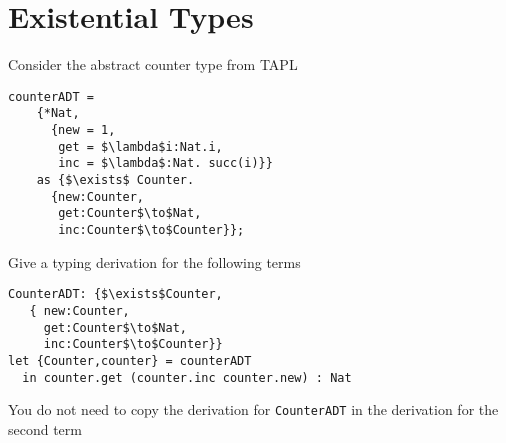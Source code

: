\section{Existential Types}
Consider the abstract counter type from TAPL
\begin{lstlisting}[mathescape=true]
  counterADT = 
    {*Nat,
      {new = 1,
       get = $\lambda$i:Nat.i,
       inc = $\lambda$:Nat. succ(i)}}
    as {$\exists$ Counter.
      {new:Counter,
       get:Counter$\to$Nat,
       inc:Counter$\to$Counter}}; 
\end{lstlisting}
Give a typing derivation for the following terms 
\begin{lstlisting}[mathescape=true]
CounterADT: {$\exists$Counter, 
   { new:Counter, 
     get:Counter$\to$Nat, 
     inc:Counter$\to$Counter}} 
let {Counter,counter} = counterADT 
  in counter.get (counter.inc counter.new) : Nat
\end{lstlisting}
You do not need to copy the derivation for \lstinline{CounterADT} in the derivation for the second term


